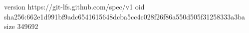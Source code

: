 version https://git-lfs.github.com/spec/v1
oid sha256:662e1d991bf9adc6541615648dcba5cc4c028f26f86a550d505f31258333a3ba
size 349692
